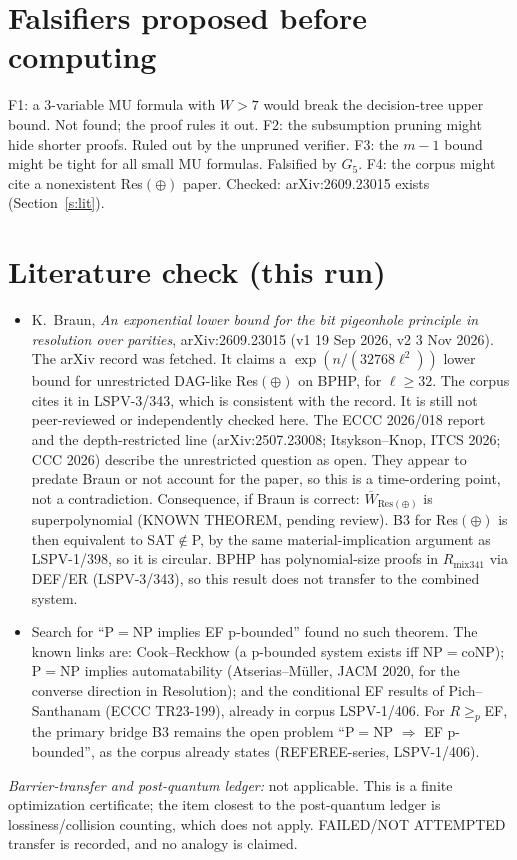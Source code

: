 \documentclass[11pt]{article}
\begin{document}
\section*{Falsifiers proposed before computing}
F1: a 3-variable MU formula with $W>7$ would break the decision-tree upper bound. Not found; the proof rules it out.
F2: the subsumption pruning might hide shorter proofs. Ruled out by the unpruned verifier.
F3: the $m-1$ bound might be tight for all small MU formulas. Falsified by $G_5$.
F4: the corpus might cite a nonexistent Res$(\oplus)$ paper. Checked: arXiv:2609.23015 exists (Section~\ref{s:lit}).

\section*{Literature check (this run)}\label{s:lit}
\begin{itemize}
\item K.~Braun, \emph{An exponential lower bound for the bit pigeonhole principle in resolution over parities},
arXiv:2609.23015 (v1 19 Sep 2026, v2 3 Nov 2026). The arXiv record was fetched. It claims a $\exp(n/(32768\ell^2))$ lower bound for
unrestricted DAG-like Res$(\oplus)$ on BPHP, for $\ell\ge32$. The corpus cites it in LSPV-3/343, which is consistent with the record.
It is still not peer-reviewed or independently checked here. The ECCC 2026/018 report and the depth-restricted line
(arXiv:2507.23008; Itsykson--Knop, ITCS 2026; CCC 2026) describe the unrestricted question as open. They appear to predate Braun or
not account for the paper, so this is a time-ordering point, not a contradiction. Consequence, if Braun is correct:
$\overline W_{\mathrm{Res}(\oplus)}$ is superpolynomial (KNOWN THEOREM, pending review). B3 for Res$(\oplus)$ is then
equivalent to SAT$\notin$P, by the same material-implication argument as LSPV-1/398, so it is circular. BPHP has
polynomial-size proofs in $R_{\mathrm{mix341}}$ via DEF/ER (LSPV-3/343), so this result does not transfer to the combined system.
\item Search for ``P$=$NP implies EF p-bounded'' found no such theorem. The known links are: Cook--Reckhow (a p-bounded system exists
iff NP$=$coNP); P$=$NP implies automatability (Atserias--M\"uller, JACM 2020, for the converse direction in Resolution); and the
conditional EF results of Pich--Santhanam (ECCC TR23-199), already in corpus LSPV-1/406. For $R\ge_p$EF, the primary bridge B3 remains
the open problem ``P$=$NP $\Rightarrow$ EF p-bounded'', as the corpus already states (REFEREE-series, LSPV-1/406).
\end{itemize}
\emph{Barrier-transfer and post-quantum ledger:} not applicable. This is a finite optimization certificate; the item closest to the
post-quantum ledger is lossiness/collision counting, which does not apply. FAILED/NOT ATTEMPTED transfer is recorded, and no analogy
is claimed.
\end{document}
